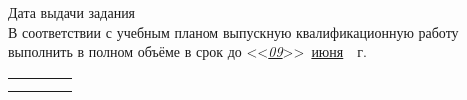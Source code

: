 \noindent Дата выдачи задания \TaskStatementDate\\

\noindent В соответствии с учебным планом выпускную квалификационную работу выполнить в полном объёме в срок до <<\underline{\textit{09}}>>~\underline{июня}~\Year~г.

\vspace{30pt}

\noindent \begin{tabular}{p{}>{\raggedleft}p{}p{}P{0.2\textwidth}}
	                           \\[5pt]
	 \\
\end{tabular}

\vspace{10pt}

